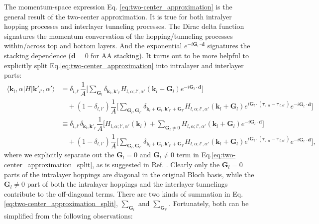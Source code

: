 The momentum-space expression Eq. \eqref{eq:two-center_approximation} is the general result of the two-center approximation. It is true for both intralyer hopping processes and interlayer tunneling processes. The Dirac delta function signatures the momentum convervation of the hopping/tunneling processes within/across top and bottom layers. And the exponential $e^{-i\bm G_l\cdot\bm d}$ signatures the stacking dependence ($\bm d=0$ for AA stacking). It turns out to be more helpful to explicitly split Eq.\eqref{eq:two-center_approximation} into intralayer and interlayer parts:
\begin{align}
    \langle \bm k_l,\alpha|H|\bm k'_{l'},\alpha'\rangle & = \delta_{l,l'}\dfrac{1}{A}\bigg[\sum_{\bm G_l}\delta_{\bm k_l,\bm k'_{l'}}H_{l,\alpha;l',\alpha'}(\bm k_l+\bm G_l)e^{-i\bm G_l\cdot\bm d}\bigg]\nonumber                                                                                                                                   \\
                                                        & \quad +(1-\delta_{l,l'})\dfrac{1}{A}\bigg[\sum_{\bm G_l,\bm G_{l'}}\delta_{\bm k_l+\bm G_l,\bm k'_{l'}+\bm G_{l'}}H_{l,\alpha;l',\alpha'}(\bm k_l+\bm G_l) e^{i\bm G_l\cdot(\bm\tau_{l,\alpha}-\bm\tau_{l,\alpha'})}e^{-i\bm G_l\cdot\bm d}\bigg]\nonumber                                  \\
                                                        & \equiv\delta_{l,l'}\delta_{\bm k_l,\bm k'_{l'}}\dfrac{1}{A}\bigg[H_{l,\alpha;l',\alpha'}(\bm k_l) + \sum_{\bm G_l\neq0}H_{l,\alpha;l',\alpha'}(\bm k_l+\bm G_l)e^{-i\bm G_l\cdot\bm d}\bigg]\nonumber                                                                                       \\
                                                        & \quad +(1-\delta_{l,l'})\dfrac{1}{A}\bigg[\sum_{\bm G_l,\bm G_{l'}}\delta_{\bm k_l+\bm G_l,\bm k'_{l'}+\bm G_{l'}}H_{l,\alpha;l',\alpha'}(\bm k_l+\bm G_l) e^{i\bm G_l\cdot(\bm\tau_{l,\alpha}-\bm\tau_{l,\alpha'})}e^{-i\bm G_l\cdot\bm d}\bigg],\label{eq:two-center_approximation_split}
\end{align}
where we explicitly separate out the $\bm G_l=0$ and $\bm G_l\neq0$ term in Eq.\eqref{eq:two-center_approximation_split}, as is suggested in Ref. \cite{jung2014ab}. Clearly only the $\bm G_l=0$ parts of the intralayer hoppings are diagonal in the original Bloch basis, while the $\bm G_l\neq0$ part of both the intralayer hoppings and the interlayer tunnelings contribute to the off-diagonal terms. There are two kinds of summation in Eq.\eqref{eq:two-center_approximation_split}, $\sum_{\bm G_l}$ and $\sum_{\bm G_{l'}}$. Fortunately, both can be simplified from the following observations:

